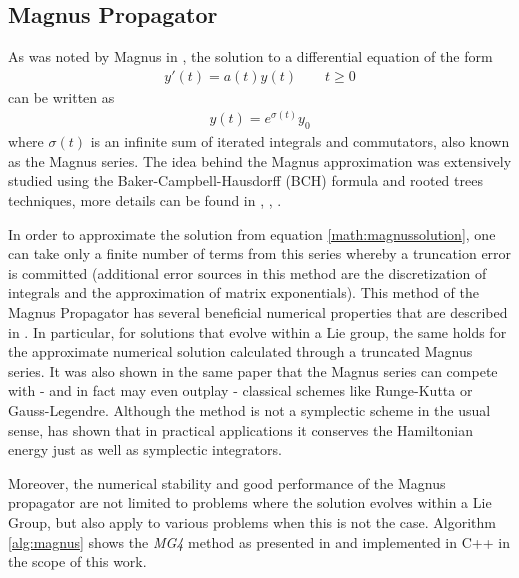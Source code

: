 \subsection{Magnus Propagator}
\label{sub:magnus_propagator}
%
As was noted by Magnus in \cite{Magnus1954}, the solution to a differential equation of the form
%
\begin{align}
	y'(t) = a(t) y(t) \qquad t \ge 0
\end{align}
%
can be written as
%
\begin{align}
	\label{math:magnussolution}
	y(t) = e^{\sigma (t)} y_0
\end{align}
%
where $\sigma (t)$ is an infinite sum of iterated integrals and commutators, also known as the Magnus series.
The idea behind the Magnus approximation was extensively studied using the Baker-Campbell-Hausdorff (BCH) formula and rooted trees techniques, more details can be found in \cite{Blanes2006}, \cite{Blanes2000}, \cite{Iserles1999}.
\par\medskip
%
In order to approximate the solution from equation \ref{math:magnussolution}, one can take only a finite number of terms from this series whereby a truncation error is committed
(additional error sources in this method are the discretization of integrals and the approximation of matrix exponentials).
%
This method of the Magnus Propagator has several beneficial numerical properties that are described in \cite{Iserles1999}.
In particular, for solutions that evolve within a Lie group, the same holds for the approximate numerical solution calculated through a truncated Magnus series. 
It was also shown in the same paper that the Magnus series can compete with - and in fact may even outplay - classical schemes like Runge-Kutta or Gauss-Legendre.
Although the method is not a symplectic scheme in the usual sense, \cite{Iserles1999} has shown that in practical applications it conserves the Hamiltonian energy just as well as symplectic integrators.
\par\medskip
Moreover, the numerical stability and good performance of the Magnus propagator are not limited to problems where the solution evolves within a Lie Group, but also apply to various problems when this is not the case.
Algorithm \ref{alg:magnus} shows the \emph{MG4} method as presented in \cite{Iserles1999} and implemented in C++ in the scope of this work.

